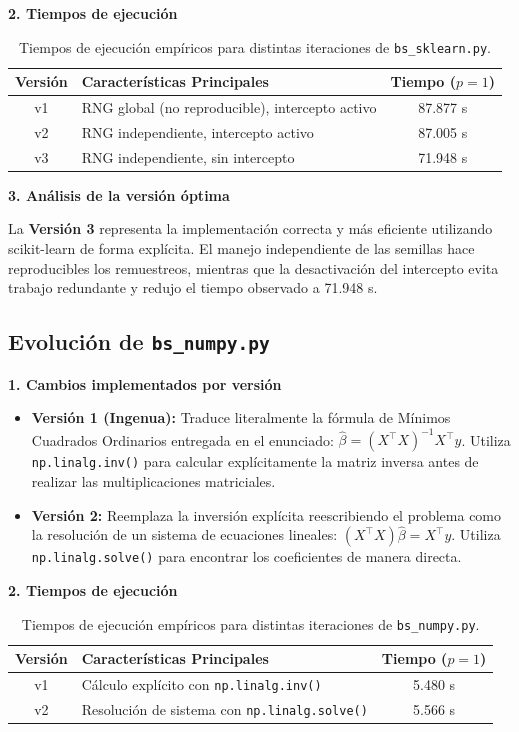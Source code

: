 \documentclass[12pt, letterpaper]{article}
\begin{document}
\textbf{2. Tiempos de ejecución}

\begin{table}[h]
    \centering
    \begin{tabular}{|c|l|c|}
    \hline
    \textbf{Versión} & \textbf{Características Principales} & \textbf{Tiempo ($p=1$)} \\
    \hline
    v1 & RNG global (no reproducible), intercepto activo & 87.877 s \\
    v2 & RNG independiente, intercepto activo & 87.005 s \\
    v3 & RNG independiente, sin intercepto & 71.948 s \\
    \hline
    \end{tabular}
    \caption{Tiempos de ejecución empíricos para distintas iteraciones de \texttt{bs\_sklearn.py}.}
\end{table}

\textbf{3. Análisis de la versión óptima}

La \textbf{Versión 3} representa la implementación correcta y más eficiente utilizando scikit-learn de forma explícita. El manejo independiente de las semillas hace reproducibles los remuestreos, mientras que la desactivación del intercepto evita trabajo redundante y redujo el tiempo observado a 71.948 s.

\subsection*{Evolución de \texttt{bs\_numpy.py}}

\textbf{1. Cambios implementados por versión}
\begin{itemize}
    \item \textbf{Versión 1 (Ingenua):} Traduce literalmente la fórmula de Mínimos Cuadrados Ordinarios entregada en el enunciado: $\hat{\beta} = (X^{\top}X)^{-1}X^{\top}y$. Utiliza \texttt{np.linalg.inv()} para calcular explícitamente la matriz inversa antes de realizar las multiplicaciones matriciales.
    \item \textbf{Versión 2:} Reemplaza la inversión explícita reescribiendo el problema como la resolución de un sistema de ecuaciones lineales: $(X^{\top}X)\hat{\beta} = X^{\top}y$. Utiliza \texttt{np.linalg.solve()} para encontrar los coeficientes de manera directa.
\end{itemize}

\textbf{2. Tiempos de ejecución}

\begin{table}[h]
    \centering
    \begin{tabular}{|c|l|c|}
    \hline
    \textbf{Versión} & \textbf{Características Principales} & \textbf{Tiempo ($p=1$)} \\
    \hline
    v1 & Cálculo explícito con \texttt{np.linalg.inv()} & 5.480 s \\
    v2 & Resolución de sistema con \texttt{np.linalg.solve()} & 5.566 s \\
    \hline
    \end{tabular}
    \caption{Tiempos de ejecución empíricos para distintas iteraciones de \texttt{bs\_numpy.py}.}
\end{table}
\end{document}
